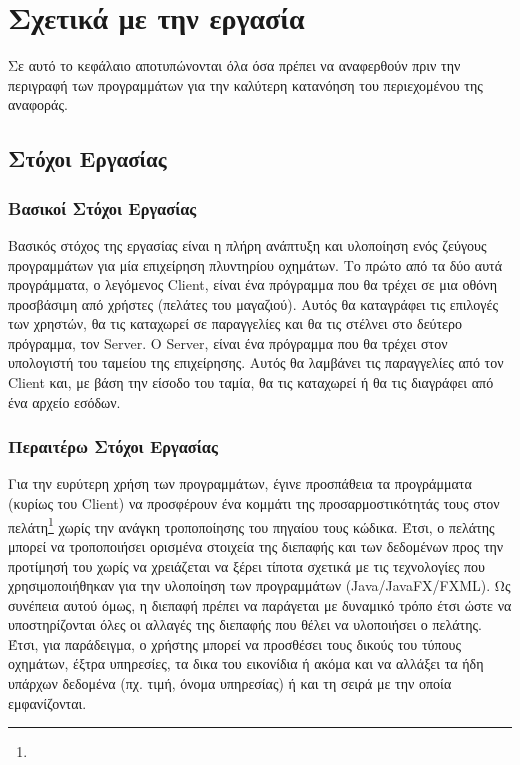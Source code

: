 \chapter{Σχετικά με την εργασία}
\label{ch:ChapterName1}
Σε αυτό το κεφάλαιο αποτυπώνονται όλα όσα πρέπει να αναφερθούν πριν την περιγραφή των προγραμμάτων για την καλύτερη κατανόηση του περιεχομένου της αναφοράς.

    \section{Στόχοι Εργασίας}
    \label{sec:SectionName1.1}

    \subsection{Βασικοί Στόχοι Εργασίας}
    \label{sec:SubSectionName1.1.1}
    
    Βασικός στόχος της εργασίας είναι η πλήρη ανάπτυξη και υλοποίηση ενός ζεύγους προγραμμάτων για μία επιχείρηση πλυντηρίου οχημάτων. Το πρώτο από τα δύο αυτά προγράμματα, ο λεγόμενος Client, είναι ένα πρόγραμμα που θα τρέχει σε μια οθόνη προσβάσιμη από χρήστες (πελάτες του μαγαζιού). Αυτός θα καταγράφει τις επιλογές των χρηστών, θα τις καταχωρεί σε παραγγελίες και θα τις στέλνει στο δεύτερο πρόγραμμα, τον Server. Ο Server, είναι ένα πρόγραμμα που θα τρέχει στον υπολογιστή του ταμείου της επιχείρησης. Αυτός θα λαμβάνει τις παραγγελίες από τον Client και, με βάση την είσοδο του ταμία, θα τις καταχωρεί ή θα τις διαγράφει από ένα αρχείο εσόδων.\newpage
    
    \subsection{Περαιτέρω Στόχοι Εργασίας}
    \label{sec:SubSectionName1.1.2}
    Για την ευρύτερη χρήση των προγραμμάτων, έγινε προσπάθεια τα προγράμματα (κυρίως του Client) να προσφέρουν ένα κομμάτι της προσαρμοστικότητάς τους στον πελάτη\footnote{} χωρίς την ανάγκη τροποποίησης του πηγαίου τους κώδικα. Έτσι, ο πελάτης μπορεί να τροποποιήσει ορισμένα στοιχεία της διεπαφής και των δεδομένων προς την προτίμησή του χωρίς να χρειάζεται να ξέρει τίποτα σχετικά με τις τεχνολογίες που χρησιμοποιήθηκαν για την υλοποίηση των προγραμμάτων (Java/JavaFX/FXML). 
    Ως συνέπεια αυτού όμως, η διεπαφή πρέπει να παράγεται με δυναμικό τρόπο έτσι ώστε να υποστηρίζονται όλες οι αλλαγές της διεπαφής που θέλει να υλοποιήσει ο πελάτης. Έτσι, για παράδειγμα, ο χρήστης μπορεί να προσθέσει τους δικούς του τύπους οχημάτων, έξτρα υπηρεσίες, τα δικα του εικονίδια ή ακόμα και να αλλάξει τα ήδη υπάρχων δεδομένα (πχ. τιμή, όνομα υπηρεσίας) ή και τη σειρά με την οποία εμφανίζονται. 
    \newpage
    

